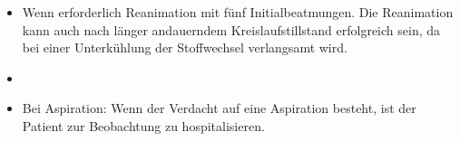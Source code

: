\label{m:ertrinkungsunfall}
\begin{itemize}
  \item Wenn erforderlich Reanimation mit fünf
  Initialbeatmungen. Die Reanimation kann auch nach länger
  andauerndem Kreislaufstillstand erfolgreich sein, da bei
  einer Unterkühlung der Stoffwechsel verlangsamt wird.
  \item \TxBeiVit \TxMassVitMK
  \item Bei Aspiration: Wenn der Verdacht auf eine
  Aspiration besteht, ist der Patient zur Beobachtung zu
  hospitalisieren.
\end{itemize}